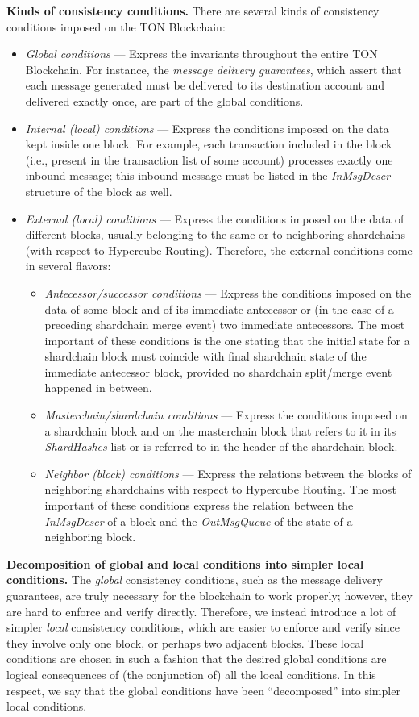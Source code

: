 \documentclass[12pt,oneside]{article}
\def\makepoint#1{\medbreak\noindent{\bf #1.\ }}
\def\nxsubpoint{\refstepcounter{subsubsection}%
  \smallbreak\makepoint{\thesubsubsection}}
\def\emb#1{\textbf{#1.}}
\begin{document}
\nxsubpoint\emb{Kinds of consistency conditions}
There are several kinds of consistency conditions imposed on the TON Blockchain:
\begin{itemize}
\item {\em Global conditions} --- Express the invariants throughout the entire TON Blockchain. For instance, the {\em message delivery guarantees}, which assert that each message generated must be delivered to its destination account and delivered exactly once, are part of the global conditions.
\item {\em Internal (local) conditions} --- Express the conditions imposed on the data kept inside one block. For example, each transaction included in the block (i.e., present in the transaction list of some account) processes exactly one inbound message; this inbound message must be listed in the {\em InMsgDescr\/} structure of the block as well.
\item {\em External (local) conditions} --- Express the conditions imposed on the data of different blocks, usually belonging to the same or to neighboring shardchains (with respect to Hypercube Routing). Therefore, the external conditions come in several flavors:
  \begin{itemize}
  \item {\em Antecessor/successor conditions} --- Express the conditions imposed on the data of some block and of its immediate antecessor or (in the case of a preceding shardchain merge event) two immediate antecessors. The most important of these conditions is the one stating that the initial state for a shardchain block must coincide with final shardchain state of the immediate antecessor block, provided no shardchain split/merge event happened in between.
  \item {\em Masterchain/shardchain conditions} --- Express the conditions imposed on a shardchain block and on the masterchain block that refers to it in its {\em ShardHashes\/} list or is referred to in the header of the shardchain block.
  \item {\em Neighbor (block) conditions} --- Express the relations between the blocks of neighboring shardchains with respect to Hypercube Routing. The most important of these conditions express the relation between the {\em InMsgDescr\/} of a block and the {\em OutMsgQueue\/} of the state of a neighboring block.
  \end{itemize}
\end{itemize}

\nxsubpoint\emb{Decomposition of global and local conditions into simpler local conditions}
The {\em global\/} consistency conditions, such as the message delivery guarantees, are truly necessary for the blockchain to work properly; however, they are hard to enforce and verify directly. Therefore, we instead introduce a lot of simpler {\em local\/} consistency conditions, which are easier to enforce and verify since they involve only one block, or perhaps two adjacent blocks. These local conditions are chosen in such a fashion that the desired global conditions are logical consequences of (the conjunction of) all the local conditions. In this respect, we say that the global conditions have been ``decomposed'' into simpler local conditions.
\end{document}
